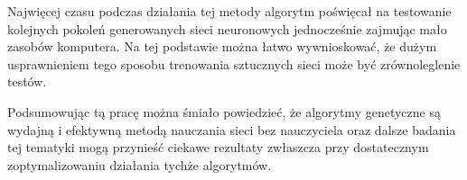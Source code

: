 \documentclass[12pt, oneside, a4paper]{report}
\begin{document}
Najwięcej czasu podczas działania tej metody algorytm poświęcał na testowanie kolejnych pokoleń generowanych sieci neuronowych jednocześnie zajmując mało zasobów komputera. Na tej podstawie można łatwo wywnioskować, że dużym usprawnieniem tego sposobu trenowania sztucznych sieci może być zrównoleglenie testów.

Podsumowując tą pracę można śmiało powiedzieć, że algorytmy genetyczne są wydajną i efektywną metodą nauczania sieci bez nauczyciela oraz dalsze badania tej tematyki mogą przynieść ciekawe rezultaty zwłaszcza przy dostatecznym zoptymalizowaniu działania tychże algorytmów.

\pagebreak


\end{document}

